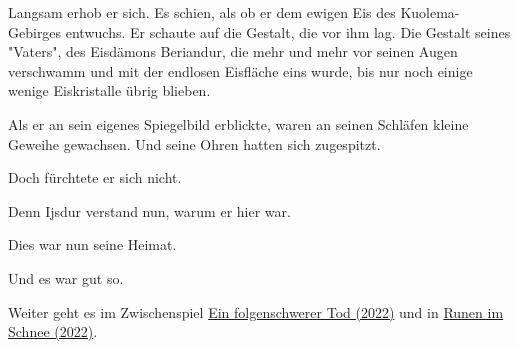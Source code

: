 Langsam erhob er sich. Es schien, als ob er dem ewigen Eis des Kuolema-Gebirges entwuchs. Er schaute auf die Gestalt, die vor ihm lag. Die Gestalt seines "Vaters", des Eisdämons Beriandur, die mehr und mehr vor seinen Augen verschwamm und mit der endlosen Eisfläche eins wurde, bis nur noch einige wenige Eiskristalle übrig blieben.

Als er an sein eigenes Spiegelbild erblickte, waren an seinen Schläfen kleine Geweihe gewachsen. Und seine Ohren hatten sich zugespitzt.

Doch fürchtete er sich nicht.

Denn Ijsdur verstand nun, warum er hier war.

Dies war nun seine Heimat.

Und es war gut so.



\begin{commentbox}
    Weiter geht es im Zwischenspiel \hyperref[2022-ein-folgenschwerer-tod]{Ein folgenschwerer Tod (2022)} und in \hyperref[2022-runen-im-schnee]{Runen im Schnee (2022)}.
\end{commentbox}










